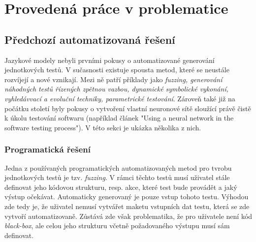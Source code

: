 \documentclass[czech, ma, kiv, he, iso690alph, pdf, viewonly]{fasthesis}
\begin{document}
    \section{Provedená práce v problematice} \label{sec:previouswork}
        \subsection{Předchozí automatizovaná řešení}
        Jazykové modely nebyli prvními pokusy o automatizované generování jednotkových testů. V sučasnosti existuje spousta metod, které se neustále rozvíjejí a nové vznikají. Mezi ně patří příklady jako \textit{fuzzing, generování náhodných testů řízených zpětnou vazbou, dynamické symbolické vykonání, vyhledávvací a evoluční techniky, parametrické testování}. Zároveň také již na počátku století byly pokusy o vytvoření vlastní neuronové sítě sloužící právě čistě k úkolu testování softwaru (například článek "Using a neural network in the software testing process"). \cite{Vanmali2002UsingAN} V této sekci je ukázka několika z nich. 

        \subsubsection{Programatická řešení}
        Jedna z používaných programatických automatizovaných metod pro tvrobu jednotkových testů je tzv. \textit{fuzzing}. V rámci těchto testů musí uživatel stále definovat jeho kódovou strukturu, resp. akce, které test bude provádět a jaký výstup očekávat. Automaticky generovaný je pouze vstup tohoto testu. Výhodou zde tedy je, že uživatel nemusí vytvářet maketu vstupních dat testu, která se zde vytvoří automatizovaně. Zůstává zde však problematika, že pro uživatele není kód \emph{black-box}, ale celou jeho strukturu včetně požadovaného výstupu musí sám definovat. \cite{fuzzing}
\end{document}
